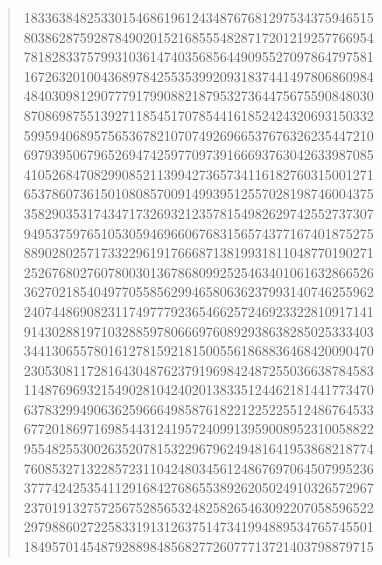 \documentclass[oneside,12pt]{book}   	%
\theoremstyle{definition}
\begin{document}
\begin{spacing}{1.618}
\begin{quote}
18336384825330154686196124348767681297534375946515 \\
80386287592878490201521685554828717201219257766954 \\
78182833757993103614740356856449095527097864797581 \\
16726320100436897842553539920931837441497806860984 \\
48403098129077791799088218795327364475675590848030 \\
87086987551392711854517078544161852424320693150332 \\
59959406895756536782107074926966537676326235447210 \\
69793950679652694742597709739166693763042633987085 \\
41052684708299085211399427365734116182760315001271 \\
65378607361501080857009149939512557028198746004375 \\
35829035317434717326932123578154982629742552737307 \\
94953759765105305946966067683156574377167401875275 \\
88902802571733229619176668713819931811048770190271 \\
25267680276078003013678680992525463401061632866526 \\
36270218540497705585629946580636237993140746255962 \\
24074486908231174977792365466257246923322810917141 \\
91430288197103288597806669760892938638285025333403 \\
34413065578016127815921815005561868836468420090470 \\
23053081172816430487623791969842487255036638784583 \\
11487696932154902810424020138335124462181441773470 \\
63783299490636259666498587618221225225512486764533 \\
67720186971698544312419572409913959008952310058822 \\
95548255300263520781532296796249481641953868218774 \\
76085327132285723110424803456124867697064507995236 \\
37774242535411291684276865538926205024910326572967 \\
23701913275725675285653248258265463092207058596522 \\
29798860272258331913126375147341994889534765745501 \\
18495701454879288984856827726077713721403798879715 \\

\end{quote}
\end{spacing}
\end{document}
